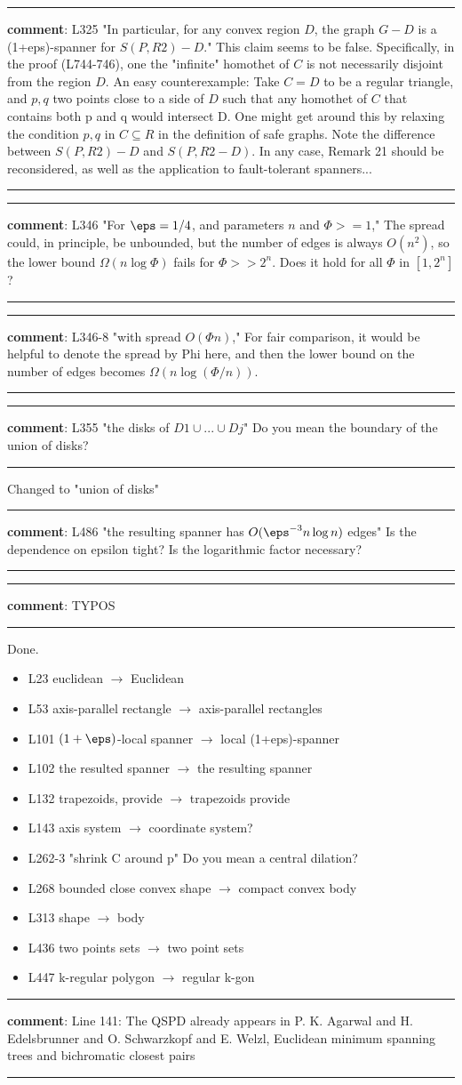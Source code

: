 \documentclass[12pt]{article}%
\newcommand{\hr}{\noindent \rule{\linewidth}{0.2mm}}%
\newcommand{\Hr}{\noindent \rule{\linewidth}{0.6mm}}%
\newcommand{\reviewCX}[1]{%

   \bigskip%
   \noindent%
   \Hr

   \bigskip%
   \noindent%
   \textbf{comment}: #1

   \noindent%
   \hr }
\begin{document}
\reviewCX{L325 "In particular, for any convex region $D$, the graph $G-D$ is a (1+eps)-spanner for $S(P,R2)-D$." This claim seems to be false. Specifically, in the proof (L744-746), one the "infinite" homothet of $C$ is not necessarily disjoint from the region $D$. An easy counterexample: Take $C=D$ to be a regular triangle, and $p,q$ two points close to a side of $D$ such that any homothet of $C$ that contains both p and q would intersect D. One might get around this by relaxing the condition $p,q$ in $C \subseteq R$ in the definition of safe graphs. Note the difference between $S(P,R2)-D$ and $S(P,R2-D)$. In any case, Remark 21 should be reconsidered, as well as the application to fault-tolerant spanners...}

\reviewCX{L346 "For $\eps=1/4$, and parameters $n$ and $\Phi>=1$," The spread could, in principle, be unbounded, but the number of edges is always $O(n^2)$, so the lower bound $\Omega(n \log \Phi)$ fails for $\Phi>>2^n$. Does it hold for all $\Phi$ in $[1,2^n]$ ?}

\reviewCX{L346-8 "with spread $O(\Phi n)$," For fair comparison, it would be helpful to denote the spread by Phi here, and then the lower bound on the number of edges becomes $\Omega(n \log(\Phi/n))$.}

\reviewCX{L355 "the disks of $D1 \cup ... \cup Dj$" Do you mean the boundary of the union of disks?} Changed to "union of disks"

\reviewCX{L486 "the resulting spanner has $O(\eps^{-3} n \log n)$ edges" Is the dependence on epsilon tight? Is the logarithmic factor necessary?}


\reviewCX{TYPOS} Done.
\begin{itemize}
	\item L23 euclidean $\rightarrow$ Euclidean
	\item L53 axis-parallel rectangle $\rightarrow$ axis-parallel rectangles
	\item L101 $(1+\eps)$-local spanner $\rightarrow$ local (1+eps)-spanner
	\item L102 the resulted spanner $\rightarrow$ the resulting spanner
	\item L132 trapezoids, provide $\rightarrow$ trapezoids provide
	\item L143 axis system $\rightarrow$ coordinate system?
	\item L262-3 "shrink C around p" Do you mean a central dilation?
	\item L268 bounded close convex shape $\rightarrow$ compact convex body
	\item L313 shape $\rightarrow$ body
	\item L436 two points sets $\rightarrow$ two point sets
	\item L447 k-regular polygon $\rightarrow$ regular k-gon
\end{itemize}


\reviewCX{Line 141: The QSPD already appears in P. K. Agarwal and
   H. Edelsbrunner and O. Schwarzkopf and E. Welzl, Euclidean minimum
   spanning trees and bichromatic closest pairs}
\end{document}
